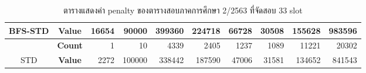 \begin{table}[]
{\begin{tabular}{@{}ccrrrrrrrr@{}}
    \multirow{-2}{*}{BFS-STD}                    & \textbf{Value}                        & 16654                          & 90000                          & 399360                         & 224718                         & 66728                          & 30508                          & 155628                         & 983596                           \\ \midrule
                                                  & {\textbf{Count}} & {1}       & {10}      & {4339}    & {2405}    & {1237}    & {1089}    & {11221}   & {20302}     \\ \cmidrule(l){2-10} 
    \multirow{-2}{*}{STD} & {\textbf{Value}} & {2272}    & {100000}  & {338442}  & {187590}  & {47006}   & {31581}   & {134652}  & {841543}    \\ \bottomrule
    \end{tabular}%
    }
    \caption{ตารางแสดงค่า penalty ของตารางสอบภาคการศึกษา 2/2563 ที่จัดสอบ 33 slot}
    \label{tab:result_table_263_33}
\end{table}
